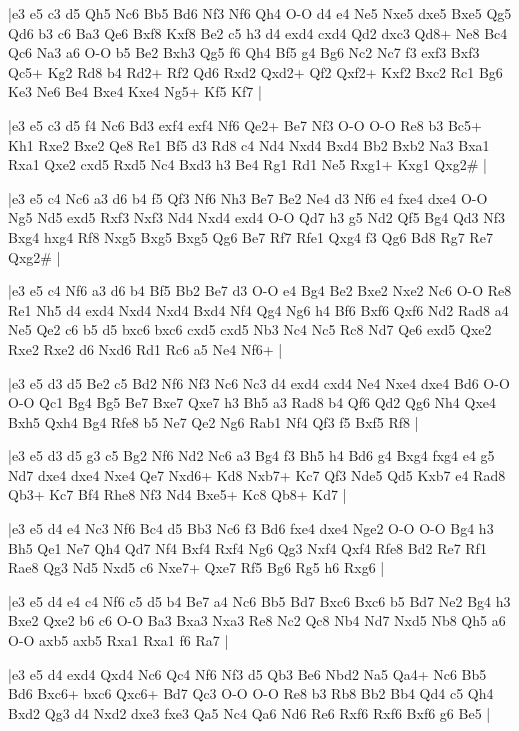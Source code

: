 \whitename{}
\blackname{}
\makegametitle
|e3 e5 c3 d5 Qh5 Nc6 Bb5 Bd6 Nf3 Nf6 Qh4 O-O d4 e4 Ne5 Nxe5 dxe5 Bxe5 Qg5 Qd6 b3 c6 Ba3 Qe6 Bxf8 Kxf8 Be2 c5 h3 d4 exd4 cxd4 Qd2 dxc3 Qd8+ Ne8 Bc4 Qc6 Na3 a6 O-O b5 Be2 Bxh3 Qg5 f6 Qh4 Bf5 g4 Bg6 Nc2 Nc7 f3 exf3 Bxf3 Qc5+ Kg2 Rd8 b4 Rd2+ Rf2 Qd6 Rxd2 Qxd2+ Qf2 Qxf2+ Kxf2 Bxc2 Rc1 Bg6 Ke3 Ne6 Be4 Bxe4 Kxe4 Ng5+ Kf5 Kf7  |

\whitename{}
\blackname{}
\makegametitle
|e3 e5 c3 d5 f4 Nc6 Bd3 exf4 exf4 Nf6 Qe2+ Be7 Nf3 O-O O-O Re8 b3 Bc5+ Kh1 Rxe2 Bxe2 Qe8 Re1 Bf5 d3 Rd8 c4 Nd4 Nxd4 Bxd4 Bb2 Bxb2 Na3 Bxa1 Rxa1 Qxe2 cxd5 Rxd5 Nc4 Bxd3 h3 Be4 Rg1 Rd1 Ne5 Rxg1+ Kxg1 Qxg2\#  |

\whitename{}
\blackname{}
\makegametitle
|e3 e5 c4 Nc6 a3 d6 b4 f5 Qf3 Nf6 Nh3 Be7 Be2 Ne4 d3 Nf6 e4 fxe4 dxe4 O-O Ng5 Nd5 exd5 Rxf3 Nxf3 Nd4 Nxd4 exd4 O-O Qd7 h3 g5 Nd2 Qf5 Bg4 Qd3 Nf3 Bxg4 hxg4 Rf8 Nxg5 Bxg5 Bxg5 Qg6 Be7 Rf7 Rfe1 Qxg4 f3 Qg6 Bd8 Rg7 Re7 Qxg2\#  |

\whitename{}
\blackname{}
\makegametitle
|e3 e5 c4 Nf6 a3 d6 b4 Bf5 Bb2 Be7 d3 O-O e4 Bg4 Be2 Bxe2 Nxe2 Nc6 O-O Re8 Re1 Nh5 d4 exd4 Nxd4 Nxd4 Bxd4 Nf4 Qg4 Ng6 h4 Bf6 Bxf6 Qxf6 Nd2 Rad8 a4 Ne5 Qe2 c6 b5 d5 bxc6 bxc6 cxd5 cxd5 Nb3 Nc4 Nc5 Rc8 Nd7 Qe6 exd5 Qxe2 Rxe2 Rxe2 d6 Nxd6 Rd1 Rc6 a5 Ne4 Nf6+  |

\whitename{}
\blackname{}
\makegametitle
|e3 e5 d3 d5 Be2 c5 Bd2 Nf6 Nf3 Nc6 Nc3 d4 exd4 cxd4 Ne4 Nxe4 dxe4 Bd6 O-O O-O Qc1 Bg4 Bg5 Be7 Bxe7 Qxe7 h3 Bh5 a3 Rad8 b4 Qf6 Qd2 Qg6 Nh4 Qxe4 Bxh5 Qxh4 Bg4 Rfe8 b5 Ne7 Qe2 Ng6 Rab1 Nf4 Qf3 f5 Bxf5 Rf8  |

\whitename{}
\blackname{}
\makegametitle
|e3 e5 d3 d5 g3 c5 Bg2 Nf6 Nd2 Nc6 a3 Bg4 f3 Bh5 h4 Bd6 g4 Bxg4 fxg4 e4 g5 Nd7 dxe4 dxe4 Nxe4 Qe7 Nxd6+ Kd8 Nxb7+ Kc7 Qf3 Nde5 Qd5 Kxb7 e4 Rad8 Qb3+ Kc7 Bf4 Rhe8 Nf3 Nd4 Bxe5+ Kc8 Qb8+ Kd7  |

\whitename{}
\blackname{}
\makegametitle
|e3 e5 d4 e4 Nc3 Nf6 Bc4 d5 Bb3 Nc6 f3 Bd6 fxe4 dxe4 Nge2 O-O O-O Bg4 h3 Bh5 Qe1 Ne7 Qh4 Qd7 Nf4 Bxf4 Rxf4 Ng6 Qg3 Nxf4 Qxf4 Rfe8 Bd2 Re7 Rf1 Rae8 Qg3 Nd5 Nxd5 c6 Nxe7+ Qxe7 Rf5 Bg6 Rg5 h6 Rxg6  |

\whitename{}
\blackname{}
\makegametitle
|e3 e5 d4 e4 c4 Nf6 c5 d5 b4 Be7 a4 Nc6 Bb5 Bd7 Bxc6 Bxc6 b5 Bd7 Ne2 Bg4 h3 Bxe2 Qxe2 b6 c6 O-O Ba3 Bxa3 Nxa3 Re8 Nc2 Qc8 Nb4 Nd7 Nxd5 Nb8 Qh5 a6 O-O axb5 axb5 Rxa1 Rxa1 f6 Ra7  |

\whitename{}
\blackname{}
\makegametitle
|e3 e5 d4 exd4 Qxd4 Nc6 Qc4 Nf6 Nf3 d5 Qb3 Be6 Nbd2 Na5 Qa4+ Nc6 Bb5 Bd6 Bxc6+ bxc6 Qxc6+ Bd7 Qc3 O-O O-O Re8 b3 Rb8 Bb2 Bb4 Qd4 c5 Qh4 Bxd2 Qg3 d4 Nxd2 dxe3 fxe3 Qa5 Nc4 Qa6 Nd6 Re6 Rxf6 Rxf6 Bxf6 g6 Be5  |

